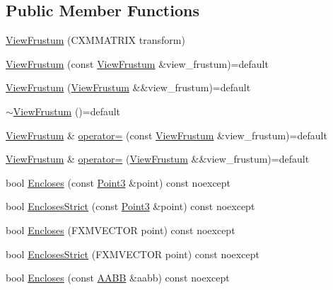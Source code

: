 \subsection*{Public Member Functions}
\begin{DoxyCompactItemize}
\item 
\hyperlink{structmage_1_1_view_frustum_a907207904846729570c21919415ba7b2}{View\+Frustum} (C\+X\+M\+M\+A\+T\+R\+IX transform)
\item 
\hyperlink{structmage_1_1_view_frustum_abbd4ec6c2766d3f630bce16cefa8bc4d}{View\+Frustum} (const \hyperlink{structmage_1_1_view_frustum}{View\+Frustum} \&view\+\_\+frustum)=default
\item 
\hyperlink{structmage_1_1_view_frustum_a3568cfa6a5d440455867eb11b88a5213}{View\+Frustum} (\hyperlink{structmage_1_1_view_frustum}{View\+Frustum} \&\&view\+\_\+frustum)=default
\item 
\hyperlink{structmage_1_1_view_frustum_aaa0e10f5401370909694e923c58323a9}{$\sim$\+View\+Frustum} ()=default
\item 
\hyperlink{structmage_1_1_view_frustum}{View\+Frustum} \& \hyperlink{structmage_1_1_view_frustum_add514821f691117c0ab139c13f86ef70}{operator=} (const \hyperlink{structmage_1_1_view_frustum}{View\+Frustum} \&view\+\_\+frustum)=default
\item 
\hyperlink{structmage_1_1_view_frustum}{View\+Frustum} \& \hyperlink{structmage_1_1_view_frustum_a0167f34c3ba505155ed6064c6d98a99c}{operator=} (\hyperlink{structmage_1_1_view_frustum}{View\+Frustum} \&\&view\+\_\+frustum)=default
\item 
bool \hyperlink{structmage_1_1_view_frustum_a68e7b7915505d42de255ffb37b4beba3}{Encloses} (const \hyperlink{structmage_1_1_point3}{Point3} \&point) const noexcept
\item 
bool \hyperlink{structmage_1_1_view_frustum_ab0df90a890172361fb520d4527d81546}{Encloses\+Strict} (const \hyperlink{structmage_1_1_point3}{Point3} \&point) const noexcept
\item 
bool \hyperlink{structmage_1_1_view_frustum_aba92d74f79b16d7ae656b2f271202d12}{Encloses} (F\+X\+M\+V\+E\+C\+T\+OR point) const noexcept
\item 
bool \hyperlink{structmage_1_1_view_frustum_a9eaa1d0fcb7e896ff13e2bc7603d613c}{Encloses\+Strict} (F\+X\+M\+V\+E\+C\+T\+OR point) const noexcept
\item 
bool \hyperlink{structmage_1_1_view_frustum_ad9bffbf0a041452888559db4a4ed5f48}{Encloses} (const \hyperlink{structmage_1_1_a_a_b_b}{A\+A\+BB} \&aabb) const noexcept

\end{DoxyCompactItemize}
